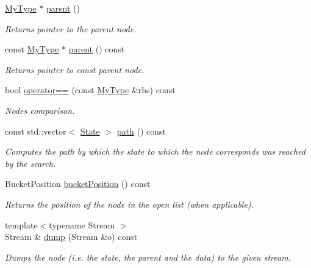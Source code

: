 \begin{DoxyCompactItemize}
\hyperlink{structslb_1_1core_1_1sb_1_1SearchNode_ae2ea0008cdc50ebc06102fcd9e5f29d2}{My\+Type} $\ast$ \hyperlink{structslb_1_1core_1_1sb_1_1SearchNode_a0ca44e44ed2c03f32a82c40a2fec2f25}{parent} ()
\begin{DoxyCompactList}\small\item\em Returns pointer to the parent node. \end{DoxyCompactList}\item 
const \hyperlink{structslb_1_1core_1_1sb_1_1SearchNode_ae2ea0008cdc50ebc06102fcd9e5f29d2}{My\+Type} $\ast$ \hyperlink{structslb_1_1core_1_1sb_1_1SearchNode_a820d6bd60d3268f13ececb1cb4443f50}{parent} () const 
\begin{DoxyCompactList}\small\item\em Returns pointer to const parent node. \end{DoxyCompactList}\item 
bool \hyperlink{structslb_1_1core_1_1sb_1_1SearchNode_aa65f7504947d00154620d1b198a2d647}{operator==} (const \hyperlink{structslb_1_1core_1_1sb_1_1SearchNode_ae2ea0008cdc50ebc06102fcd9e5f29d2}{My\+Type} \&rhs) const 
\begin{DoxyCompactList}\small\item\em Nodes comparison. \end{DoxyCompactList}\item 
const std\+::vector$<$ \hyperlink{structslb_1_1core_1_1sb_1_1SearchNode_a1ddf004be6dc181034b39283698985ac}{State} $>$ \hyperlink{structslb_1_1core_1_1sb_1_1SearchNode_aaa74c727a31774ef126f523323e7b02d}{path} () const 
\begin{DoxyCompactList}\small\item\em Computes the path by which the state to which the node corresponds was reached by the search. \end{DoxyCompactList}\item 
Bucket\+Position \hyperlink{structslb_1_1core_1_1sb_1_1SearchNode_ab437722f9c401c9067237d74e6b8635e}{bucket\+Position} () const 
\begin{DoxyCompactList}\small\item\em Returns the position of the node in the open list (when applicable). \end{DoxyCompactList}\item 
{\footnotesize template$<$typename Stream $>$ }\\Stream \& \hyperlink{structslb_1_1core_1_1sb_1_1SearchNode_a14a1a06f452df5511c320c9d34cde564}{dump} (Stream \&o) const 
\begin{DoxyCompactList}\small\item\em Dumps the node (i.\+e. the state, the parent and the data) to the given stream. \end{DoxyCompactList}\item 

\end{DoxyCompactItemize}
